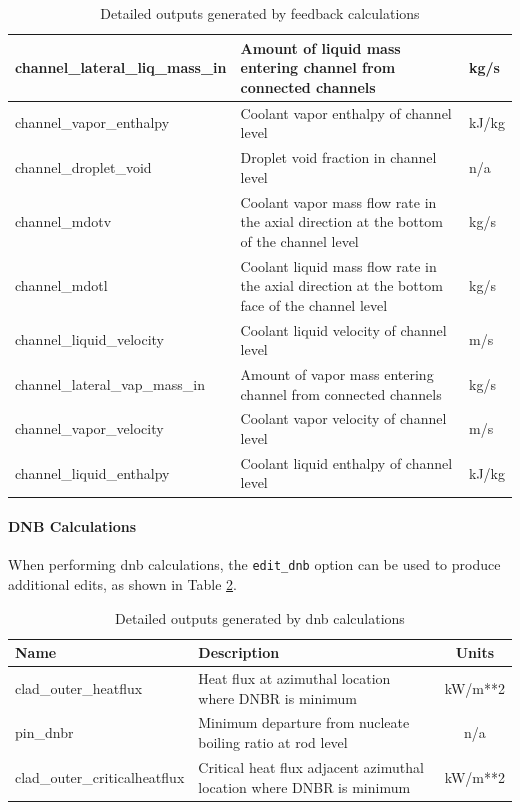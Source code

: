 \begin{table}[h]
\centering
\caption{Detailed outputs generated by feedback calculations}
\label{tab:detailed-th-edits}
\begin{tabular}{|l|p{}|l|}\hline
   channel\_lateral\_liq\_mass\_in & Amount of liquid mass entering channel from connected channels & kg/s \\\hline
   channel\_vapor\_enthalpy & Coolant vapor enthalpy of channel level & kJ/kg \\\hline
   channel\_droplet\_void & Droplet void fraction in channel level & n/a \\\hline
   channel\_mdotv & Coolant vapor mass flow rate in the axial direction at the bottom of the channel level & kg/s \\\hline
   channel\_mdotl & Coolant liquid mass flow rate in the axial direction at the bottom face of the channel level & kg/s \\\hline
   channel\_liquid\_velocity & Coolant liquid velocity of channel level & m/s \\\hline
   channel\_lateral\_vap\_mass\_in & Amount of vapor mass entering channel from connected channels & kg/s \\\hline
   channel\_vapor\_velocity & Coolant vapor velocity of channel level & m/s \\\hline
   channel\_liquid\_enthalpy & Coolant liquid enthalpy of channel level & kJ/kg \\\hline
\end{tabular}
\end{table}

\paragraph{DNB Calculations}

When performing \ac{dnb} calculations, the \texttt{edit\_dnb} option can be used to produce additional edits, as shown in Table \ref{tab:dnb-edits}.

\begin{table}[h]
\centering
\caption{Detailed outputs generated by \acrshort{dnb} calculations}
\label{tab:dnb-edits}
\begin{tabular}{|l|p{}|c|}\hline
   \textbf{Name} & \textbf{Description} & \textbf{Units} \\\hline
   clad\_outer\_heatflux & Heat flux at azimuthal location where DNBR is minimum & kW/m**2 \\\hline
   pin\_dnbr & Minimum departure from nucleate boiling ratio at rod level & n/a \\\hline
   clad\_outer\_criticalheatflux & Critical heat flux adjacent azimuthal location where DNBR is minimum & kW/m**2 \\\hline
\end{tabular}
\end{table}

